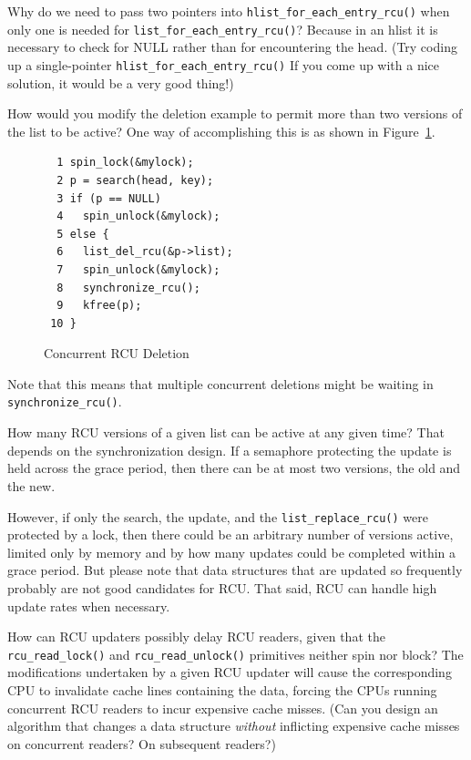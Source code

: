 \QuickQ{}
	Why do we need to pass two pointers into
	{\tt hlist\_for\_each\_entry\_rcu()}
	when only one is needed for {\tt list\_for\_each\_entry\_rcu()}?
\QuickA{}
	Because in an hlist it is necessary to check for
	NULL rather than for encountering the head.
	(Try coding up a single-pointer {\tt hlist\_for\_each\_entry\_rcu()}
	If you come up with a nice solution, it would be a very good thing!)

\QuickQ{}
	How would you modify the deletion example to permit more than two
	versions of the list to be active?
\QuickA{}
	One way of accomplishing this is as shown in
	Figure~\ref{fig:defer:Concurrent RCU Deletion}.

\begin{figure}[htbp]
{ \centering
\begin{verbatim}
  1 spin_lock(&mylock);
  2 p = search(head, key);
  3 if (p == NULL)
  4   spin_unlock(&mylock);
  5 else {
  6   list_del_rcu(&p->list);
  7   spin_unlock(&mylock);
  8   synchronize_rcu();
  9   kfree(p);
 10 }
\end{verbatim}
}
\caption{Concurrent RCU Deletion}
\label{fig:defer:Concurrent RCU Deletion}
\end{figure}

	Note that this means that multiple concurrent deletions might be
	waiting in {\tt synchronize\_rcu()}.

\QuickQ{}
	How many RCU versions of a given list can be
	active at any given time?
\QuickA{}
	That depends on the synchronization design.
	If a semaphore protecting the update is held across the grace period,
	then there can be at most two versions, the old and the new.

	However, if only the search, the update, and the
	{\tt list\_replace\_rcu()} were protected by a lock, then
	there could be an arbitrary number of versions active, limited only
	by memory and by how many updates could be completed within a
	grace period.
	But please note that data structures that are updated so frequently
	probably are not good candidates for RCU.
	That said, RCU can handle high update rates when necessary.

\QuickQ{}
	How can RCU updaters possibly delay RCU readers, given that the
	{\tt rcu\_read\_lock()} and {\tt rcu\_read\_unlock()}
	primitives neither spin nor block?
\QuickA{}
	The modifications undertaken by a given RCU updater will cause the
	corresponding CPU to invalidate cache lines containing the data,
	forcing the CPUs running concurrent RCU readers to incur expensive
	cache misses.
	(Can you design an algorithm that changes a data structure
	\emph{without}
	inflicting expensive cache misses on concurrent readers?
	On subsequent readers?)

